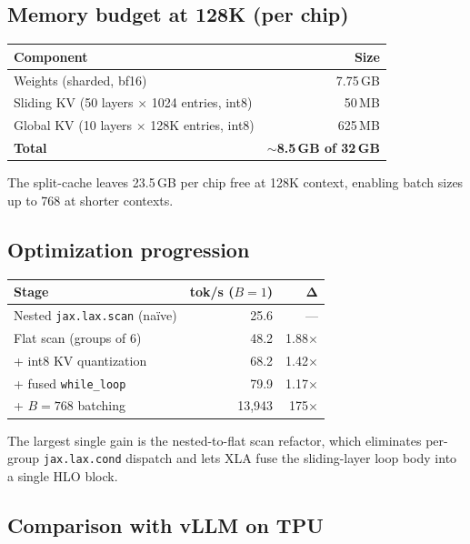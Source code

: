 \subsection{Memory budget at 128K (per chip)}

\begin{tabular}{lr}
\toprule
\textbf{Component} & \textbf{Size} \\
\midrule
Weights (sharded, bf16) & 7.75\,GB \\
Sliding KV (50 layers $\times$ 1024 entries, int8) & 50\,MB \\
Global KV (10 layers $\times$ 128K entries, int8)  & 625\,MB \\
\midrule
\textbf{Total} & \textbf{$\sim$8.5\,GB of 32\,GB} \\
\bottomrule
\end{tabular}

\vspace{0.5em}
\noindent The split-cache leaves 23.5\,GB per chip free at 128K context,
enabling batch sizes up to 768 at shorter contexts.

\subsection{Optimization progression}

\begin{tabular}{lrr}
\toprule
\textbf{Stage} & \textbf{tok/s ($B\!=\!1$)} & $\boldsymbol\Delta$ \\
\midrule
Nested \texttt{jax.lax.scan} (na\"ive)  & 25.6 & --- \\
Flat scan (groups of 6)                 & 48.2 & 1.88$\times$ \\
+ int8 KV quantization                 & 68.2 & 1.42$\times$ \\
+ fused \texttt{while\_loop}            & 79.9 & 1.17$\times$ \\
+ $B\!=\!768$ batching                  & 13{,}943 & 175$\times$ \\
\bottomrule
\end{tabular}

\vspace{0.5em}
\noindent The largest single gain is the nested-to-flat scan refactor,
which eliminates per-group \texttt{jax.lax.cond} dispatch and lets XLA
fuse the sliding-layer loop body into a single HLO block.

\subsection{Comparison with vLLM on TPU}

